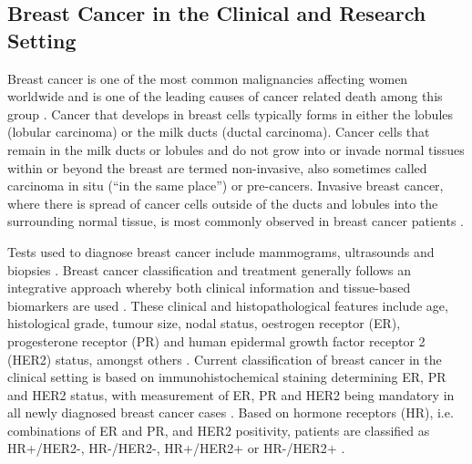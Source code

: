 \subsection{Breast Cancer in the Clinical and Research Setting}  
Breast cancer is one of the most common malignancies affecting women worldwide and is one of the leading causes of cancer related death among this group \citep{pmid28223433, pmid33538338}. Cancer that develops in breast cells typically forms in either the lobules (lobular carcinoma) or the milk ducts (ductal carcinoma). Cancer cells that remain in the milk ducts or lobules and do not grow into or invade normal tissues within or beyond the breast are termed non-invasive, also sometimes called carcinoma in situ (“in the same place”) or pre-cancers. Invasive breast cancer, where there is spread of cancer cells outside of the ducts and lobules into the surrounding normal tissue, is most commonly observed in breast cancer patients \citep{pmid24716497, pmid28969709}.    

Tests used to diagnose breast cancer include mammograms, ultrasounds and biopsies \citep{pmid19930975}. Breast cancer classification and treatment generally follows an integrative approach whereby both clinical information and tissue-based biomarkers are used \citep{pmid23395906, pmid28733194}. These clinical and histopathological features include age, histological grade, tumour size, nodal status, oestrogen receptor (ER), progesterone receptor (PR) and human epidermal growth factor receptor 2 (HER2) status, amongst others \citep{pmid28733194, pmid36482272}. Current classification of breast cancer in the clinical setting is based on immunohistochemical staining determining ER, PR and HER2 status, with measurement of ER, PR and HER2 being mandatory in all newly diagnosed breast cancer cases \citep{pmid28882552}. Based on hormone receptors (HR), i.e. combinations of ER and PR, and HER2 positivity, patients are classified as HR+/HER2-, HR-/HER2-, HR+/HER2+ or HR-/HER2+ \citep{pmid20520800}.   

